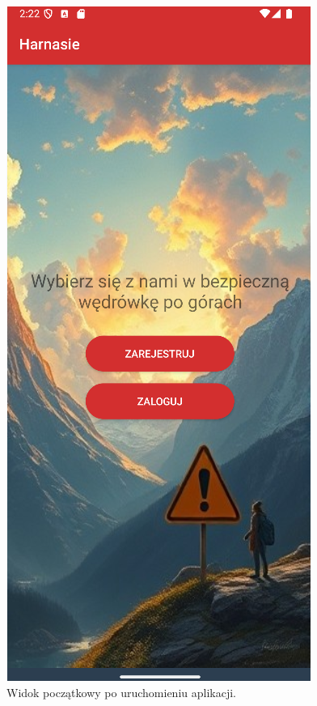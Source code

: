 \begin{figure}[H]
    \centering
    \includegraphics[scale=0.6]{img/imp/welcome.png}
    \caption{Widok początkowy po uruchomieniu aplikacji.}
    \label{widok:home}
\end{figure}

